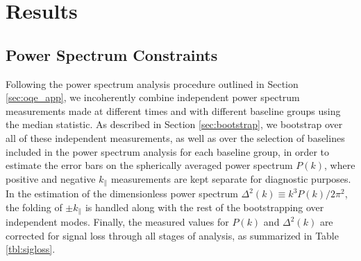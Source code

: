 \documentclass[twocolumn,numberedappendix]{emulateapj} \shorttitle{New Limits on the 21 cm Power Spectrum at $z=8.4$}
\begin{document}
%




\section{Results}\label{sec:results}

\subsection{Power Spectrum Constraints}

Following the power spectrum analysis procedure outlined in Section \ref{sec:oqe_app},
we incoherently combine independent power spectrum measurements made at different
times and with different baseline groups using the median statistic.  As described
in Section \ref{sec:bootstrap}, we bootstrap over all of these independent measurements,
as well as over the selection of baselines included in the power spectrum analysis for
each baseline group, in order to estimate the error bars on the spherically averaged
power spectrum $P(k)$, where positive and negative $k_\parallel$ measurements
are kept separate for diagnostic purposes.  In the estimation of the 
dimensionless power spectrum
$\Delta^{2}(k)\equiv{k^{3}P(k)}/{2\pi^{2}}$, the folding of $\pm k_\parallel$ is
handled along with the rest of the bootstrapping over independent modes.
Finally, the measured values for $P(k)$ and $\Delta^2(k)$ are corrected for signal
loss through all stages of analysis, as summarized in Table \ref{tbl:sigloss}.
\end{document}
